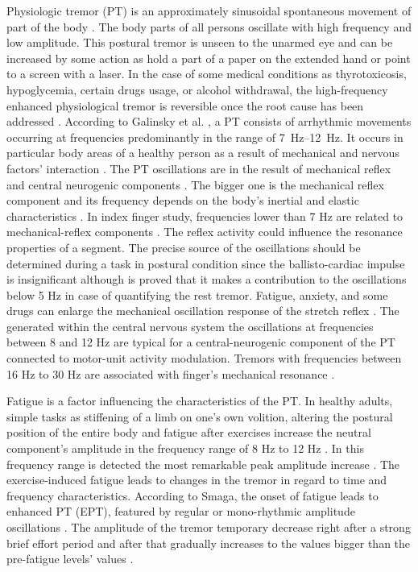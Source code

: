 \documentclass[conference, a4paper]{IEEEtran}
\begin{document}
Physiologic tremor (PT) is an approximately sinusoidal spontaneous movement of  part of the body \cite{RN21}. The body parts of all persons oscillate with high frequency and low amplitude. This postural tremor is unseen to the unarmed eye and can be increased by some action as hold a part of a paper on the extended hand or point to a screen with a laser. In the case of some medical conditions as thyrotoxicosis, hypoglycemia,  certain drugs usage, or alcohol withdrawal, the high-frequency enhanced physiological  tremor is reversible once the root cause has been addressed \cite{RN7}. According to Galinsky et al. \cite{RN4}, a PT consists of arrhythmic movements occurring at frequencies predominantly in the range of \SIrange{7}{12}{\Hz}. It occurs in particular body areas of a healthy person as a result of mechanical and nervous factors' interaction \cite{RN22}. The PT oscillations are in the result of mechanical reflex and central neurogenic components \cite{RN23,RN26}. The bigger one is the mechanical reflex component and its frequency depends on the body's inertial and elastic characteristics \cite{RN26}. In index finger study,  frequencies lower than 7 Hz are related to mechanical-reflex components \cite{RN1}. The reflex activity could influence the resonance properties of a segment. The precise source of the oscillations should be determined during a task in postural condition since the ballisto-cardiac impulse is insignificant although is proved that it makes a contribution to the oscillations below  5 Hz in case of quantifying the rest tremor. Fatigue, anxiety, and some drugs can enlarge the mechanical oscillation response of the stretch reflex \cite{RN1}. The generated within the central nervous system the oscillations at frequencies between 8 and 12 Hz are typical for a central-neurogenic component of the PT connected to motor-unit activity modulation. Tremors with frequencies between 16 Hz to 30 Hz are associated with finger's mechanical resonance \cite{RN1, RN2, RN23, RN26}.

% 
Fatigue is a factor influencing the characteristics of the PT. In healthy adults, simple tasks as stiffening of a limb on one's own volition, altering the postural position of the entire body and fatigue after exercises increase the neutral component's amplitude in the frequency range of 8 Hz to 12 Hz \cite{RN5}.  In this frequency range is detected the most remarkable peak amplitude increase \cite{RN6}. The exercise-induced fatigue leads to changes in the tremor in regard to time and frequency characteristics. According to Smaga, the onset of fatigue leads to enhanced PT (EPT), featured by regular or mono-rhythmic amplitude oscillations \cite{RN4,RN7}. The amplitude of the tremor temporary decrease right after a strong brief effort period and after that gradually increases to the values bigger than the pre-fatigue levels' values \cite{RN24,RN4}.
\end{document}
